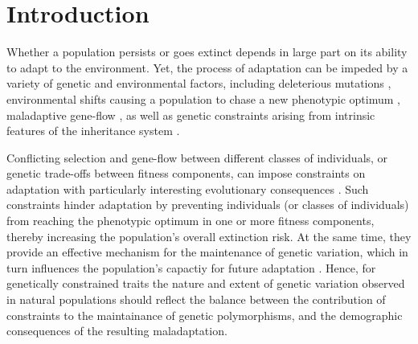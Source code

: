 \documentclass[11pt]{article}
\begin{document}
\newpage{}

\section*{Introduction}

Whether a population persists or goes extinct depends in large part on its ability to adapt to the environment. Yet, the process of adaptation can be impeded by a variety of genetic and environmental factors, including deleterious mutations \citep{Haldane1957}, environmental shifts causing a population to chase a new phenotypic optimum \citep{Maynard-Smith1976, LandeShannon1996,OrrUnckless2008}, maladaptive gene-flow \citep{KirkpatrickBarton1997, BolnickNosil2007}, as well as genetic constraints arising from intrinsic features of the inheritance system \citep{ConnallonHall2018}. 

Conflicting selection and gene-flow between different classes of individuals, or genetic trade-offs between fitness components, can impose constraints on adaptation with particularly interesting evolutionary consequences \citep{CharlesworthHughes2000, ConnallonHall2018}. Such constraints hinder adaptation by preventing individuals (or classes of individuals) from reaching the phenotypic optimum in one or more fitness components, thereby increasing the population's overall extinction risk. At the same time, they provide an effective mechanism for the maintenance of genetic variation, which in turn influences the population's capactiy for future adaptation \citep{Fisher1930, CharlesworthHughes2000, ConnallonHall2018, MatthewsConnallon2019}. Hence, for genetically constrained traits the nature and extent of genetic variation observed in natural populations should reflect the balance between the contribution of constraints to the maintainance of genetic polymorphisms, and the demographic consequences of the resulting maladaptation.
\end{document}
